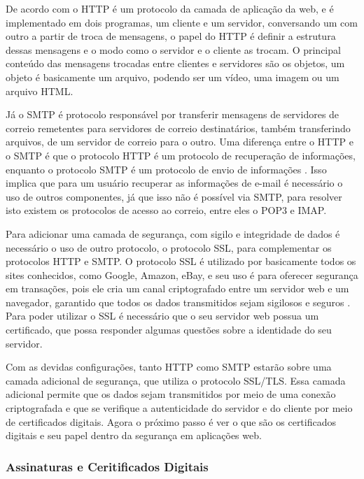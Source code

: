 De acordo com \cite{kurose2010redes} o HTTP é um protocolo da camada de aplicação
da web, e é implementado em dois programas, um cliente e um servidor, conversando
um com outro a partir de troca de mensagens, o papel do HTTP é definir a estrutura dessas
mensagens e o modo como o servidor e o cliente as trocam. O principal conteúdo das
mensagens trocadas entre clientes e servidores são os objetos, um objeto é basicamente
um arquivo, podendo ser um vídeo, uma imagem ou um arquivo HTML.

Já o SMTP é protocolo responsável por transferir mensagens de servidores de correio
remetentes para servidores de correio destinatários, também transferindo arquivos,
de um servidor de correio para o outro. Uma diferença entre o HTTP e o SMTP
é que o protocolo HTTP é um protocolo de recuperação de informações, enquanto
o protocolo SMTP é um protocolo de envio de informações \cite{kuroseredes2010}. Isso implica que para um
usuário recuperar as informações de e-mail é necessário o uso de outros componentes,
já que isso não é possível via SMTP, para resolver isto existem os protocolos
de acesso ao correio, entre eles o POP3 e IMAP.

Para adicionar uma camada de segurança, com sigilo e integridade de dados é necessário
o uso de outro protocolo, o protocolo SSL, para complementar os protocolos HTTP
e SMTP. O protocolo SSL é utilizado por basicamente todos os sites conhecidos, como Google,
Amazon, eBay, e seu uso é para oferecer segurança em transações, pois ele cria um
canal criptografado entre um servidor web e um navegador, garantido que todos os
dados transmitidos sejam sigilosos e seguros \cite{kuroseredes2010}. Para poder
utilizar o SSL é necessário que o seu servidor web possua um certificado, que
possa responder algumas questões sobre a identidade do seu servidor.

Com as devidas configurações, tanto HTTP como SMTP estarão sobre uma camada adicional de segurança,
que utiliza o protocolo SSL/TLS. Essa camada adicional permite que os dados sejam
transmitidos por meio de uma conexão criptografada e que se verifique a autenticidade
do servidor e do cliente por meio de certificados digitais. Agora o próximo passo
é ver o que são os certificados digitais e seu papel dentro da segurança em aplicações web.

\subsubsection{Assinaturas e Ceritificados Digitais}

